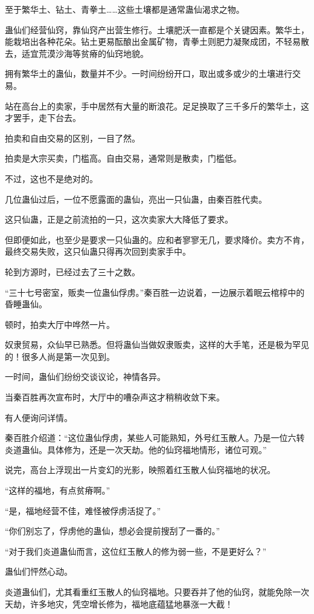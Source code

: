 \begin{this_body}
至于繁华土、钻土、青拳土……这些土壤都是通常蛊仙渴求之物。

蛊仙们经营仙窍，靠仙窍产出营生修行。土壤肥沃一直都是个关键因素。繁华土，能栽培出各种花朵。钻土更易酝酿出金属矿物，青拳土则肥力凝聚成团，不轻易散去，适宜荒漠沙海等贫瘠的仙窍地貌。

拥有繁华土的蛊仙，数量并不少。一时间纷纷开口，取出或多或少的土壤进行交易。

站在高台上的卖家，手中居然有大量的断浪花。足足换取了三千多斤的繁华土，这才罢手，走下台去。

拍卖和自由交易的区别，一目了然。

拍卖是大宗买卖，门槛高。自由交易，通常则是散卖，门槛低。

不过，这也不是绝对的。

几位蛊仙过后，一位不愿露面的蛊仙，亮出一只仙蛊，由秦百胜代卖。

这只仙蛊，正是之前流拍的一只，这次卖家大大降低了要求。

但即便如此，也至少是要求一只仙蛊的。应和者寥寥无几，要求降价。卖方不肯，最终交易失败，这只仙蛊只得再次回到卖家手中。

轮到方源时，已经过去了三十之数。

“三十七号密室，贩卖一位蛊仙俘虏。”秦百胜一边说着，一边展示着眠云棺椁中的昏睡蛊仙。

顿时，拍卖大厅中哗然一片。

奴隶贸易，众仙早已熟悉。但将蛊仙当做奴隶贩卖，这样的大手笔，还是极为罕见的！很多人尚是第一次见到。

一时间，蛊仙们纷纷交谈议论，神情各异。

当秦百胜再次宣布时，大厅中的嘈杂声这才稍稍收敛下来。

有人便询问详情。

秦百胜介绍道：“这位蛊仙俘虏，某些人可能熟知，外号红玉散人。乃是一位六转炎道蛊仙。具体修为，还是一次天劫。他的仙窍福地情形，诸位可观。”

说完，高台上浮现出一片变幻的光影，映照着红玉散人仙窍福地的状况。

“这样的福地，有点贫瘠啊。”

“是，福地经营不佳，难怪被俘虏活捉了。”

“你们别忘了，俘虏他的蛊仙，想必会提前搜刮了一番的。”

“对于我们炎道蛊仙而言，这位红玉散人的修为弱一些，不是更好么？”

蛊仙们怦然心动。

炎道蛊仙们，尤其看重红玉散人的仙窍福地。只要吞并了他的仙窍，就能免除一次天劫，许多地灾，凭空增长修为，福地底蕴猛地暴涨一大截！


\end{this_body}
